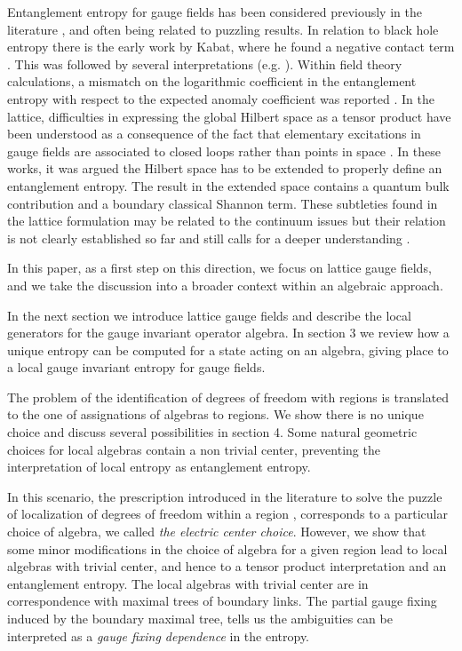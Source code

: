 \documentclass[12pt,a4paper]{article}
\begin{document}
Entanglement entropy for gauge fields has been considered previously in the literature \cite{Kabat,fursaev,Wall,Solodukhin,Zhitnitsky,Iellici:1996jx,Dowker,theisen,headrick,Polikarpov,donnelly}, and often being related to puzzling results. 
 In relation to black 
hole entropy there is the early work by Kabat, where he found a negative contact term \cite{Kabat}. This was followed by several interpretations 
(e.g. \cite{Wall,Solodukhin,Zhitnitsky,Iellici:1996jx}). 
Within field theory calculations, a mismatch on the logarithmic coefficient in the entanglement entropy with respect to the expected anomaly coefficient was reported \cite{Dowker,theisen}.
In the lattice, difficulties in expressing the global Hilbert space as a tensor product have been understood as a consequence of the fact that elementary excitations 
in gauge fields are associated to closed loops rather than points in space \cite{Polikarpov,donnelly}. In these works, it was argued the Hilbert space has to be extended to properly define an entanglement entropy. The result in the extended space contains a quantum bulk contribution and a boundary classical Shannon term. 
These subtleties found in the lattice formulation may be related to the continuum issues but their 
relation is not clearly established so far and still calls for a deeper understanding \cite{headrick}.  

In this paper, as a first step on this direction, we focus on lattice gauge fields, and we take the discussion into a broader context within an algebraic approach. 


In the next section we introduce lattice gauge fields and describe the local generators for the gauge invariant operator algebra. In section 3 we review how a unique entropy can be computed for a state acting on an algebra, giving place to a local gauge invariant entropy for gauge fields. 

The problem of the identification of degrees of freedom with regions
is translated to the one of assignations of algebras to regions. We show there is no unique choice and discuss several possibilities in section 4. 
Some natural geometric choices for local algebras contain a non trivial center, preventing the interpretation of local 
entropy as entanglement entropy. 

In this scenario, the prescription introduced in the literature to solve the puzzle of 
localization of degrees of freedom within a region \cite{Polikarpov,donnelly}, corresponds to a particular  choice of algebra, we called \textit{the electric center choice}. 
However, we  show  that some minor modifications in the choice of algebra for 
a given region lead to local algebras with trivial center, and hence to a tensor product interpretation and an entanglement entropy.  The local algebras with trivial 
center are in correspondence with  maximal trees of boundary links. The partial gauge fixing induced by the boundary maximal tree, 
tells us the ambiguities can be interpreted as a \textit{gauge fixing dependence} in the entropy. 
\end{document}
